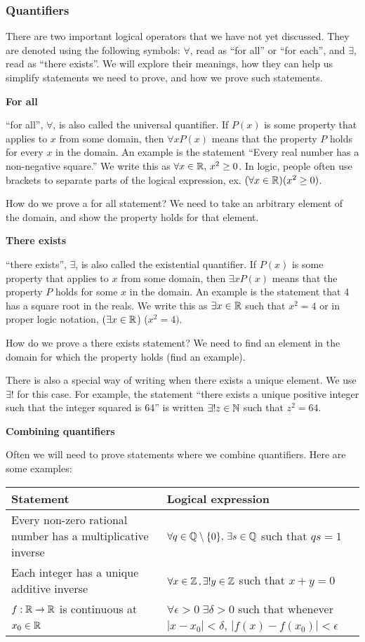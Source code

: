 \documentclass{article}
\begin{document}
\subsubsection{Quantifiers}
There are two important logical operators that we have not yet discussed. They are denoted using the following symbols: $\forall$, read as ``for all'' or ``for each'', and $\exists$, read as ``there exists''. We will explore their meanings, how they can help us simplify statements we need to prove, and how we prove such statements.

\textbf{For all}

``for all'', $\forall$, is also called the universal quantifier. If $P(x)$ is some property that applies to $x$ from some domain, then $\forall x P(x)$ means that the property $P$ holds for every $x$ in the domain. An example is the statement ``Every real number has a non-negative square.'' We write this as $\forall x \in {\mathbb{R}}, \, x^2 \geq 0$. In logic, people often use brackets to separate parts of the logical expression, ex. $(\forall x \in {\mathbb{R}}) (x^2 \geq 0)$.

How do we prove a for all statement? We need to take an arbitrary element of the domain, and show the property holds for that element.

\textbf{There exists}

``there exists'', $\exists$, is also called the existential quantifier. If $P(x)$ is some property that applies to $x$ from some domain, then $\exists x P(x)$ means that the property $P$ holds for some $x$ in the domain. An example is the statement that 4 has a square root in the reals. We write this as $\exists x \in {\mathbb{R}}$ such that $x^2 = 4$ or in proper logic notation, $(\exists x \in {\mathbb{R}}$) ($x^2 = 4)$.

How do we prove a there exists statement? We need to find an element in the domain for which the property holds (find an example).

There is also a special way of writing when there exists a unique element. We use $\exists!$ for this case. For example, the statement ``there exists a unique positive integer such that the integer squared is 64'' is written $\exists!  z \in {\mathbb{N}}$ such that $z^2 = 64$.

\textbf{Combining quantifiers}

Often we will need to prove statements where we combine quantifiers. Here are some examples:

\begin{tabular}{p{} p{}}
     Statement & Logical expression \\
     \hline
     Every non-zero rational number has a multiplicative inverse & $\forall q \in {\mathbb{Q}} \setminus \{0\}, \, \exists s \in {\mathbb{Q}}$ such that $qs=1$ \\
     Each integer has a unique additive inverse & $\forall x \in {\mathbb{Z}} \, , \exists ! y \in {\mathbb{Z}}$ such that $x+y = 0$ \\
     $f:{\mathbb{R}} \to {\mathbb{R}}$ is continuous at $x_0\in{\mathbb{R}}$ \ &  $\forall \epsilon >0 \; \exists \delta > 0$ such that whenever $|x - x_0| < \delta$, $|f(x)-f(x_0)| < \epsilon$
\end{tabular}
\end{document}
